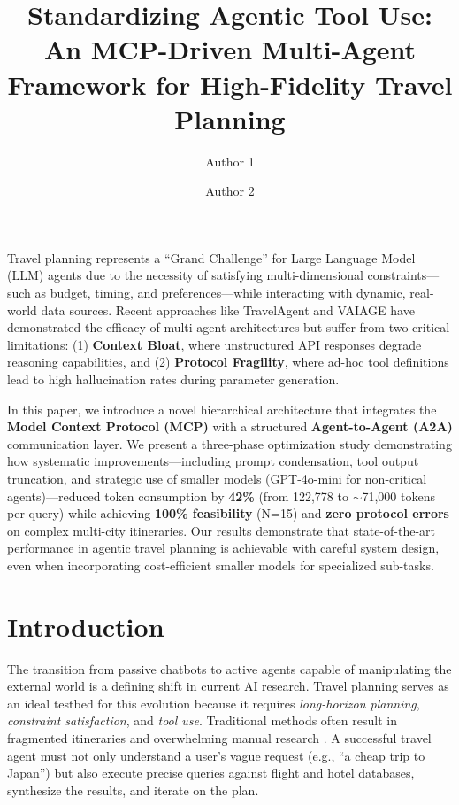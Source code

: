 \documentclass[10pt,twocolumn]{article}
\title{\textbf{\Large Standardizing Agentic Tool Use: An MCP-Driven Multi-Agent Framework for High-Fidelity Travel Planning}}
\author[1]{Author 1}
\author[1]{Author 2}
\affil[1]{Anonymous Institution}
\date{} %
\renewenvironment{abstract}
 {\small
  \begin{center}
  \bfseries \abstractname\vspace{-.5em}\vspace{0pt}
  \end{center}
  \list{}{%
    \setlength{\leftmargin}{1cm}%
    \setlength{\rightmargin}{1cm}%
  }
  \item\relax}
 {\endlist}
\begin{document}
\maketitle

\begin{abstract}
Travel planning represents a ``Grand Challenge'' for Large Language Model (LLM) agents due to the necessity of satisfying multi-dimensional constraints---such as budget, timing, and preferences---while interacting with dynamic, real-world data sources. Recent approaches like TravelAgent and VAIAGE have demonstrated the efficacy of multi-agent architectures but suffer from two critical limitations: (1) \textbf{Context Bloat}, where unstructured API responses degrade reasoning capabilities, and (2) \textbf{Protocol Fragility}, where ad-hoc tool definitions lead to high hallucination rates during parameter generation. 

In this paper, we introduce a novel hierarchical architecture that integrates the \textbf{Model Context Protocol (MCP)} with a structured \textbf{Agent-to-Agent (A2A)} communication layer. We present a three-phase optimization study demonstrating how systematic improvements---including prompt condensation, tool output truncation, and strategic use of smaller models (GPT-4o-mini for non-critical agents)---reduced token consumption by \textbf{42\%} (from 122,778 to $\sim$71,000 tokens per query) while achieving \textbf{100\% feasibility} (N=15) and \textbf{zero protocol errors} on complex multi-city itineraries. Our results demonstrate that state-of-the-art performance in agentic travel planning is achievable with careful system design, even when incorporating cost-efficient smaller models for specialized sub-tasks.
\end{abstract}

\section{Introduction}

The transition from passive chatbots to active agents capable of manipulating the external world is a defining shift in current AI research. Travel planning serves as an ideal testbed for this evolution because it requires \textit{long-horizon planning}, \textit{constraint satisfaction}, and \textit{tool use}. Traditional methods often result in fragmented itineraries and overwhelming manual research \cite{dhote2025smart, anitha2025intelligent}. A successful travel agent must not only understand a user's vague request (e.g., ``a cheap trip to Japan'') but also execute precise queries against flight and hotel databases, synthesize the results, and iterate on the plan.
\end{document}
